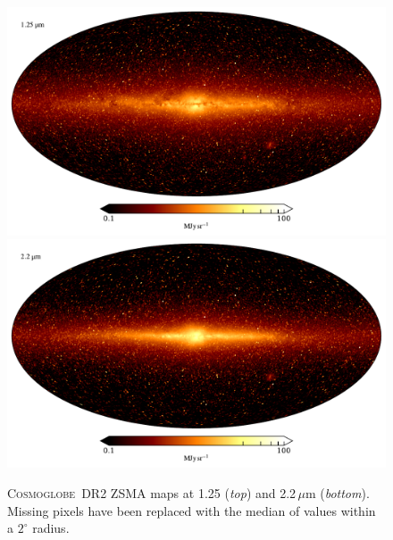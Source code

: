 \documentclass{aa}
\newcommand{\cosmoglobe}{\textsc{Cosmoglobe}}
\begin{document}
\begin{figure}
	\centering
	\includegraphics[width=\linewidth]{figs/map_01.pdf}\\
	\includegraphics[width=\linewidth]{figs/map_02.pdf}
	\caption{\cosmoglobe\ DR2 ZSMA maps at 1.25 (\emph{top}) and
          2.2$\,\mu$m (\emph{bottom}). Missing pixels have been replaced with
          the median of values within a $2^\circ$ radius.}
	\label{fig:freqmaps1_2}
\end{figure}
\end{document}
